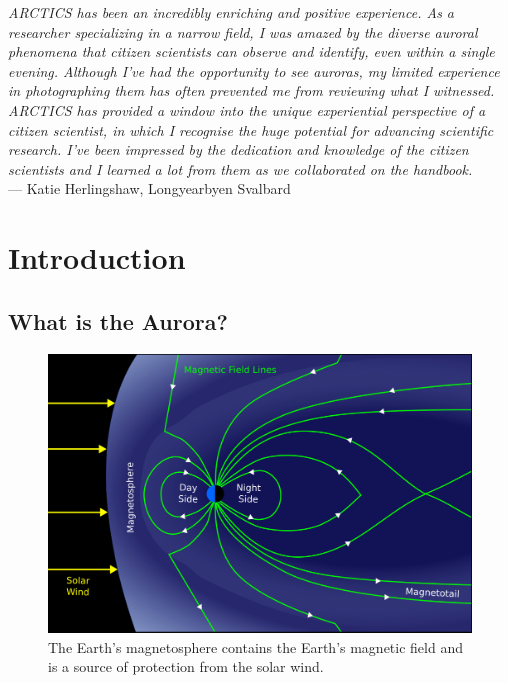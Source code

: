 \documentclass{article}
\newcommand{\contributed}[1]{%
    \par\noindent
    \begingroup
    \setlength{\leftskip}{1em}%
    \itshape
    Contributors: #1
    \par
    \endgroup
    \vspace{0.5em}
}
\begin{document}
\textit{ARCTICS has been an incredibly enriching and positive experience. As a researcher specializing in a narrow field, I was amazed by the diverse auroral phenomena that citizen scientists can observe and identify, even within a single evening. Although I’ve had the opportunity to see auroras, my limited experience in photographing them has often prevented me from reviewing what I witnessed. ARCTICS has provided a window into the unique experiential perspective of a citizen scientist, in which I recognise the huge potential for advancing scientific research. I’ve been impressed by the dedication and knowledge of the citizen scientists and I learned a lot from them as we collaborated on the handbook.}\\
--- Katie Herlingshaw, Longyearbyen Svalbard

\section{Introduction}

\subsection{What is the Aurora?} 
\begin{figure}
\includegraphics[width=\linewidth]{Fig1_magnetosphere.png}
\caption{The Earth's magnetosphere contains the Earth's magnetic field and is a source of protection from the solar wind.}
\label{fig:magnetosphere}
\end{figure} 
\end{document}
